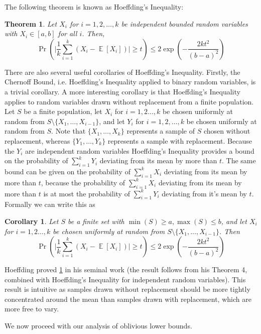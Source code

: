 \documentclass[twocolumn]{article}[10pt]
\DeclareMathOperator{\E}{\mathbb{E}}
\newtheorem{corollary}{Corollary}
\newtheorem{theorem}{Theorem}
\begin{document}
The following theorem is known as Hoeffding's Inequality:
\begin{theorem}
  Let $X_i$ for $i=1,2,\ldots, k$ be independent bounded random variables with
  $X_i \in [a,b]$ for all $i$. Then,
  $$\Pr\left(\Big|\frac{1}{k} \sum_{i=1}^k (X_i - \E[X_i])\Big|\ge t\right) \le
  2\exp\left(-\frac{2kt^2}{(b-a)^2}\right) $$
\end{theorem}
There are also several useful corollaries of Hoeffding's Inequality. 
Firstly, the Chernoff Bound, i.e. Hoeffding's Inequality applied to binary
random variables, is a trivial corollary.
A more interesting corollary is that Hoeffding's Inequality applies to random
variables drawn without replacement from a finite population.
Let $S$ be a finite population, let $X_i$ for $i=1,2\ldots, k$ be chosen
uniformly at random from $S \setminus \{X_1,\ldots, X_{i-1}\}$, and let $Y_i$
for $i=1,2,\ldots, k$ be chosen uniformly at random from $S$.
Note that $\{X_1,\ldots, X_k\}$ represents a sample of $S$ chosen without
replacement, whereas $\{Y_1,\ldots, Y_k\}$ represents a sample with
replacement. Because the $Y_i$ are independent random variables
Hoeffding's Inequality provides a bound on the probability of $\sum_{i=1}^k
Y_i$ deviating from its mean by more than $t$.
The same bound can be given on the probability of $\sum_{i=1}^k X_i$ deviating
from its mean by more than $t$, because the probability of $\sum_{i=1}^k X_i$
deviating from its mean by more than $t$ is at most the probability of
$\sum_{i=1}^k Y_i$ deviating from it's mean by $t$.
Formally we can write this as 
\begin{corollary}
  \label{cor:hoeffdingwreplacement}
  Let $S$ be a finite set with $\min(S) \ge a, \max(S) \le b$, and let $X_i$
  for $i=1,2\ldots, k$ be chosen uniformly at random from $S \setminus
  \{X_1,\ldots, X_{i-1}\}$.
Then 
  $$\Pr\left(\Big|\frac{1}{k} \sum_{i=1}^k (X_i - \E[X_i])\Big|\ge t\right) \le
  2\exp\left(-\frac{2kt^2}{(b-a)^2}\right) $$
\end{corollary}
Hoeffding proved \cref{cor:hoeffdingwreplacement} in his seminal work
\cite{who62} (the result follows from his Theorem 4, combined with Hoeffding's
Inequality for independent random variables).
This result is intuitive as samples drawn without replacement should be more
tightly concentrated around the mean than samples drawn with replacement, which
are more free to vary.

We now proceed with our analysis of oblivious lower bounds.
\end{document}
